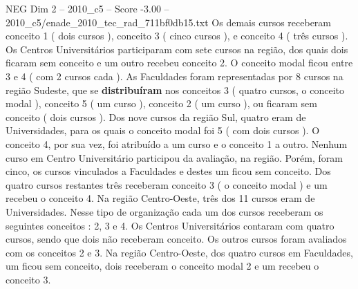 \begin{textsample}{NEG Dim 2 – 2010\_c5 – Score -3.00 – 2010\_c5/enade\_2010\_tec\_rad\_711bf0db15.txt}
Os demais cursos receberam conceito 1 ( dois cursos ), conceito 3 ( cinco cursos ), e conceito 4 ( três cursos ).
Os Centros Universitários participaram com sete cursos na região, dos quais dois ficaram sem conceito e um outro recebeu conceito 2.
O conceito modal ficou entre 3 e 4 ( com 2 cursos cada ).
As Faculdades foram representadas por 8 cursos na região Sudeste, que se \textbf{distribuíram} nos conceitos 3 ( quatro cursos, o conceito modal ), conceito 5 ( um curso ), conceito 2 ( um curso ), ou ficaram sem conceito ( dois cursos ).
Dos nove cursos da região Sul, quatro eram de Universidades, para os quais o conceito modal foi 5 ( com dois cursos ).
O conceito 4, por sua vez, foi atribuído a um curso e o conceito 1 a outro.
Nenhum curso em Centro Universitário participou da avaliação, na região.
Porém, foram cinco, os cursos vinculados a Faculdades e destes um ficou sem conceito.
Dos quatro cursos restantes três receberam conceito 3 ( o conceito modal ) e um recebeu o conceito 4.
Na região Centro-Oeste, três dos 11 cursos eram de Universidades.
Nesse tipo de organização cada um dos cursos receberam os seguintes conceitos : 2, 3 e 4.
Os Centros Universitários contaram com quatro cursos, sendo que dois não receberam conceito.
Os outros cursos foram avaliados com os conceitos 2 e 3.
Na região Centro-Oeste, dos quatro cursos em Faculdades, um ficou sem conceito, dois receberam o conceito modal 2 e um recebeu o conceito 3.

\end{textsample}
